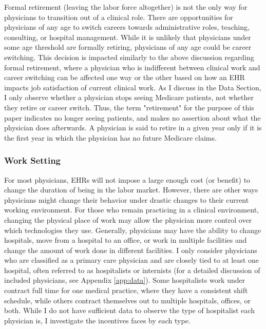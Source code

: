 \documentclass[12pt]{article}
\begin{document}
Formal retirement (leaving the labor force altogether) is not the only way for physicians to transition out of a clinical role. There are opportunities for physicians of any age to switch careers towards administrative roles, teaching, consulting, or hospital management. While it is unlikely that physicians under some age threshold are formally retiring, physicians of any age could be career switching. This decision is impacted similarly to the above discussion regarding formal retirement, where a physician who is indifferent between clinical work and career switching can be affected one way or the other based on how an EHR impacts job satisfaction of current clinical work. As I discuss in the Data Section, I only observe whether a physician stops seeing Medicare patients, not whether they retire or career switch. Thus, the term "retirement" for the purpose of this paper indicates no longer seeing patients, and makes no assertion about what the physician does afterwards. A physician is said to retire in a given year only if it is the first year in which the physician has no future Medicare claims.



\subsubsection{Work Setting}

For most physicians, EHRs will not impose a large enough cost (or benefit) to change the duration of being in the labor market. However, there are other ways physicians might change their behavior under drastic changes to their current working environment. For those who remain practicing in a clinical environment, changing the physical place of work may allow the physician more control over which technologies they use. Generally, physicians may have the ability to change hospitals, move from a hospital to an office, or work in multiple facilities and change the amount of work done in different facilities. I only consider physicians who are classified as a primary care physician and are closely tied to at least one hospital, often referred to as hospitalists or internists (for a detailed discussion of included physicians, see Appendix \ref{app:data}). Some hospitalists work under contract full time for one medical practice, where they have a consistent shift schedule, while others contract themselves out to multiple hospitals, offices, or both. While I do not have sufficient data to observe the type of hospitalist each physician is, I investigate the incentives faces by each type.
\end{document}
